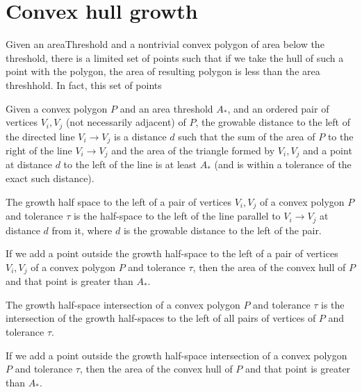 \chapter{Convex hull growth}

Given an areaThreshold and a nontrivial convex polygon of area below the threshold, 
there is a limited set of points
such that if we take the hull of such a point with the polygon, the area of resulting polygon is less than the area threshhold.
In fact, this set of points

\begin{definition}
  Given a convex polygon $P$ and an area threshold $A_*$, and an ordered pair of vertices $V_i, V_j$ (not necessarily adjacent) of $P$, the growable distance to the left of the directed line $V_i \to V_j$ is a distance $d$ such that the sum of the area of $P$ to the right of the line $V_i \to V_j$ and the area of the triangle formed by $V_i, V_j$ and a point at distance $d$ to the left of the line is at least $A_*$ (and is within a tolerance of the exact such distance).
\end{definition}

\begin{definition}
  The growth half space to the left of a pair of vertices $V_i, V_j$ of a convex polygon $P$ and tolerance $\tau$ is the half-space to the left of the line parallel to $V_i \to V_j$ at distance $d$ from it, where $d$ is the growable distance to the left of the pair. 
\end{definition}

\begin{lemma}
  If we add a point outside the growth half-space to the left of a pair of vertices $V_i, V_j$ of a convex polygon $P$ and tolerance $\tau$, then the area of the convex hull of $P$ and that point is greater than $A_*$. 
\end{lemma}

\begin{definition}
  The growth half-space intersection of a convex polygon $P$ and tolerance $\tau$ is the intersection of the growth half-spaces to the left of all pairs of vertices of $P$ and tolerance $\tau$.
\end{definition}

\begin{lemma}
  If we add a point outside the growth half-space intersection of a convex polygon $P$ and tolerance $\tau$, then the area of the convex hull of $P$ and that point is greater than $A_*$.
\end{lemma}
